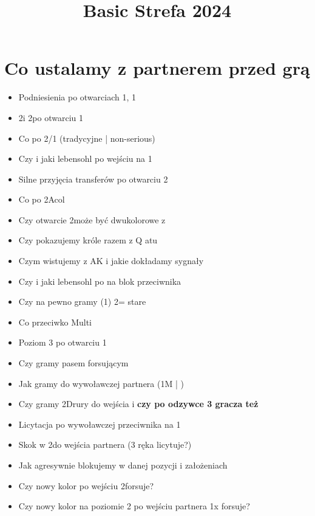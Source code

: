 \documentclass[12pt, a4paper]{article}
\title{\vspace{-2.5cm}Basic Strefa 2024}
\author{}
\date{}
\begin{document}
\maketitle

\section*{Co ustalamy z partnerem przed grą}
\begin{itemize}
    \item Podniesienia po otwarciach 1\hearts, 1\spades \vimp
    \item 2\spades i 2\nt po otwarciu 1\nt
    \item Co po 2/1 (tradycyjne | non-serious) 
    \item Czy i jaki lebensohl po wejściu na 1\nt
    \br
    \item Silne przyjęcia transferów po otwarciu 2\nt \imp
    \item Co po 2\clubs Acol
    \item Czy otwarcie 2\hearts może być dwukolorowe z \spades
    \item Czy pokazujemy króle razem z Q atu
    \item Czym wistujemy z AK i jakie dokładamy sygnały
    \item Czy i jaki lebensohl po \dbl na blok przeciwnika
    \br
    \item Czy na pewno gramy (1\clubs) 2\diams = stare \exq
    \item Co przeciwko Multi 
    \item Poziom 3 po otwarciu 1\nt
    \item Czy gramy pasem forsującym
    \item Jak gramy do \dbl wywoławczej partnera (1M \nf | \fonce\!)
    \item Czy gramy 2\clubs Drury do wejścia i \textbf{czy po odzywce 3 gracza też}
    \item Licytacja po \dbl wywoławczej przeciwnika na 1\major
    \item Skok w 2\nt do wejścia partnera (3 ręka licytuje?)
    \item Jak agresywnie blokujemy w danej pozycji i założeniach
    \br 
    \item Czy nowy kolor po wejściu 2\minor forsuje? \qq
    \item Czy nowy kolor na poziomie 2 po wejściu partnera 1x forsuje?
\end{itemize}

\pagebreak
\end{document}

